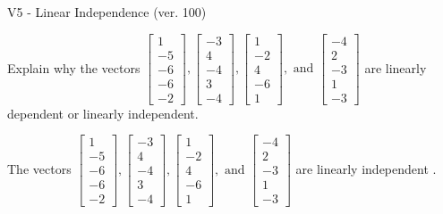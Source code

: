 \begin{exercise}
  \begin{exerciseTitle}V5 - Linear Independence (ver. 100)\end{exerciseTitle}
  \begin{exerciseStatement}
    Explain why the vectors \(\left[\begin{array}{r}
1 \\
-5 \\
-6 \\
-6 \\
-2
\end{array}\right] , \left[\begin{array}{r}
-3 \\
4 \\
-4 \\
3 \\
-4
\end{array}\right] , \left[\begin{array}{r}
1 \\
-2 \\
4 \\
-6 \\
1
\end{array}\right] , \text{ and } \left[\begin{array}{r}
-4 \\
2 \\
-3 \\
1 \\
-3
\end{array}\right]\) are linearly dependent or linearly independent.	


  \end{exerciseStatement}
  \begin{exerciseAnswer}
   The vectors \(\left[\begin{array}{r}
1 \\
-5 \\
-6 \\
-6 \\
-2
\end{array}\right] , \left[\begin{array}{r}
-3 \\
4 \\
-4 \\
3 \\
-4
\end{array}\right] , \left[\begin{array}{r}
1 \\
-2 \\
4 \\
-6 \\
1
\end{array}\right] , \text{ and } \left[\begin{array}{r}
-4 \\
2 \\
-3 \\
1 \\
-3
\end{array}\right]\) are 
  	 linearly independent  .
  


  \end{exerciseAnswer}
\end{exercise}